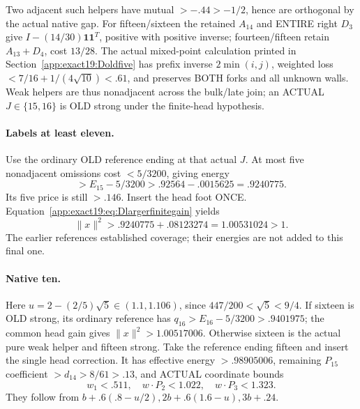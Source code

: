 \documentclass[11pt]{article}
\theoremstyle{definition}
\theoremstyle{remark}
\begin{document}
Two adjacent such helpers have mutual \(>-.44>-1/2\), hence are
orthogonal by the actual native gap.
For fifteen/sixteen the retained \(A_{14}\) and ENTIRE right \(D_3\)
give \(I-(14/30)\mathbf1\mathbf1^T\), positive with positive inverse;
fourteen/fifteen retain \(A_{13}+D_4\), cost \(13/28\).
The actual mixed-point calculation printed in
Section~\ref{app:exact19:Doldfive} has prefix inverse \(2\min(i,j)\),
weighted loss \(<7/16+1/(4\sqrt{10})<.61\), and preserves BOTH forks
and all unknown walls.
Weak helpers are thus nonadjacent across the bulk/late join; an ACTUAL
\(J\in\{15,16\}\) is OLD strong under the finite-head hypothesis.

\paragraph{Labels at least eleven.}
Use the ordinary OLD reference ending at that actual \(J\).
At most five nonadjacent omissions cost \(<5/3200\), giving energy
\[
                        >E_{15}-5/3200>.92564-.0015625=.9240775 .
\]
Its five price is still \(>.146\).
Insert the head foot ONCE.
Equation~\eqref{app:exact19:eq:Dlargerfinitegain} yields
\[
                         \|x\|^2>.9240775+.08123274=1.00531024>1 .
\]
The earlier references established coverage; their energies are not
added to this final one.

\paragraph{Native ten.}
Here \(u=2-(2/5)\sqrt5\in(1.1,1.106)\), since
\(447/200<\sqrt5<9/4\).
If sixteen is OLD strong, its ordinary reference has
\(q_{16}>E_{16}-5/3200>.9401975\); the common head gain gives
\(\|x\|^2>1.00517006\).
Otherwise sixteen is the actual pure weak helper and fifteen strong.
Take the reference ending fifteen and insert the single head correction.
It has effective energy \(>.98905006\), remaining \(P_{15}\) coefficient
\(>d_{14}>8/61>.13\), and ACTUAL coordinate bounds
\[
                   w_1<.511,\quad w\cdot P_2<1.022,\quad
                                             w\cdot P_3<1.323 .
\]
They follow from \(b+.6(.8-u/2),2b+.6(1.6-u),3b+.24\).
\end{document}
